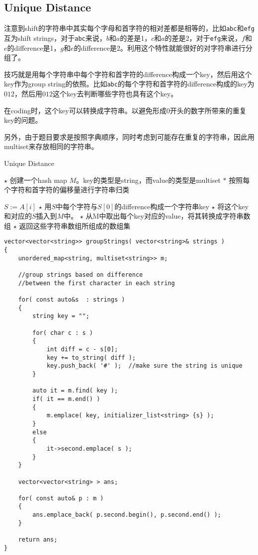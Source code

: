 \subsection{Unique Distance}
注意到shift的字符串中其实每个字母和首字符的相对差都是相等的，比如\texttt{abc}和\texttt{efg}互为shift strings，对于\texttt{abc}来说，$b$和$a$的差是1，$c$和$a$的差是2，对于\texttt{efg}来说，$f$和$e$的difference是1，$g$和$e$的difference是2。利用这个特性就能很好的对字符串进行分组了。
\par
技巧就是用每个字符串中每个字符和首字符的difference构成一个key，然后用这个key作为group string的依照。比如\texttt{abc}的每个字符和首字符的difference构成的key为$012$，然后用$012$这个key去判断哪些字符也具有这个key。
\par
在coding时，这个key可以转换成字符串。以避免形成0开头的数字所带来的重复key的问题。
\par
另外，由于题目要求是按照字典顺序，同时考虑到可能存在重复的字符串，因此用multiset来存放相同的字符串。
\setcounter{algorithm}{0}
\begin{algorithm}[H]
\caption{Unique Distance}
\begin{algorithmic}[1]
\State $\star$ 创建一个hash map $M$。key的类型是string，而value的类型是multiset
\State $\ast$ 按照每个字符和首字符的偏移量进行字符串归类
\end{algorithmic}
\end{algorithm}
\begin{algorithm}[H]
\begin{algorithmic}[1]
\State $S:=A[i]$
\State $\star$ 用$S$中每个字符与$S[0]$的difference构成一个字符串key
\State $\star$ 将这个key和对应的$S$插入到$M$中。
\EndFor
\State $\star$ 从M中取出每个key对应的value，将其转换成字符串数组
\State $\star$ 返回这些字符串数组所组成的数组集
\EndProcedure
\end{algorithmic}
\end{algorithm}
\setcounter{lstlisting}{0}
\begin{lstlisting}[style=customc, caption={Unique Distance}]
vector<vector<string>> groupStrings( vector<string>& strings )
{
    unordered_map<string, multiset<string>> m;

    //group strings based on difference
    //between the first character in each string

    for( const auto&s  : strings )
    {
        string key = "";

        for( char c : s )
        {
            int diff = c - s[0];
            key += to_string( diff );
            key.push_back( '#' );  //make sure the string is unique
        }

        auto it = m.find( key );
        if( it == m.end() )
        {
            m.emplace( key, initializer_list<string> {s} );
        }
        else
        {
            it->second.emplace( s );
        }
    }

    vector<vector<string> > ans;

    for( const auto& p : m )
    {
        ans.emplace_back( p.second.begin(), p.second.end() );
    }

    return ans;
}
\end{lstlisting}